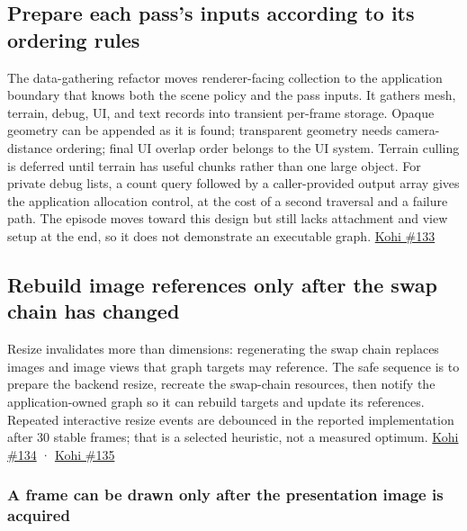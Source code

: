 \subsection{Prepare each pass's inputs according to its ordering rules}\label{06-engine-ii-ch026-prepare-each-passs-inputs-according-to-its-ordering-rules}

The data-gathering refactor moves renderer-facing collection to the application boundary that knows both the scene policy and the pass inputs. It gathers mesh, terrain, debug, UI, and text records into transient per-frame storage. Opaque geometry can be appended as it is found; transparent geometry needs camera-distance ordering; final UI overlap order belongs to the UI system. Terrain culling is deferred until terrain has useful chunks rather than one large object. For private debug lists, a count query followed by a caller-provided output array gives the application allocation control, at the cost of a second traversal and a failure path. The episode moves toward this design but still lacks attachment and view setup at the end, so it does not demonstrate an executable graph. \href{https://www.youtube.com/watch?v=wIdIXUnaIL0}{Kohi \#133}

\subsection{Rebuild image references only after the swap chain has changed}\label{06-engine-ii-ch026-rebuild-image-references-only-after-the-swap-chain-has-changed}

Resize invalidates more than dimensions: regenerating the swap chain replaces images and image views that graph targets may reference. The safe sequence is to prepare the backend resize, recreate the swap-chain resources, then notify the application-owned graph so it can rebuild targets and update its references. Repeated interactive resize events are debounced in the reported implementation after 30 stable frames; that is a selected heuristic, not a measured optimum. \href{https://www.youtube.com/watch?v=AR6c1Bn57G4}{Kohi \#134} · \href{https://www.youtube.com/watch?v=zdZP0uQ4Pi8}{Kohi \#135}

\subsubsection{A frame can be drawn only after the presentation image is acquired}\label{06-engine-ii-ch026-a-frame-can-be-drawn-only-after-the-presentation-image-is-acquired}

